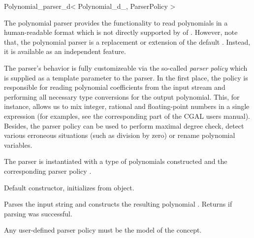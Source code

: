 % 
% 



\begin{ccRefClass}{Polynomial_parser_d< Polynomial_d_, ParserPolicy >}
\def\ccTagOperatorLayout{\ccFalse}


\ccDefinition

The polynomial parser provides the functionality to read polynomials in a human-readable format which
is not directly supported by  of . However, note that,
the polynomial parser is  a replacement or extension of the default . Instead,
it is available as an independent feature.

The parser's behavior is fully customizeable via the so-called {\em parser policy} 
which is supplied as a template parameter to the parser. 
In the first place, the policy is responsible for reading polynomial 
coefficients from the input stream and performing all necessary type conversions
for the output polynomial. This, for instance, allows us to mix integer, rational and 
floating-point numbers in a single expression (for examples, see the corresponding part of 
the CGAL users manual).
Besides, the parser policy can be used to perform maximal degree check,
detect various erroneous situations (such as division by zero) 
or rename polynomial variables.

\ccParameters
The parser is instantiated with a type 
of polynomials constructed  and the corresponding parser policy . 


\ccCreation
{}

% 

{Default constructor, initializes from  object.}

\ccOperations

{Parses the input string  and constructs the resulting polynomial . 
Returns  if parsing was successful.} 

Any user-defined parser policy must be the model of the 
concept.

\ccSeeAlso
{}

\end{ccRefClass}

